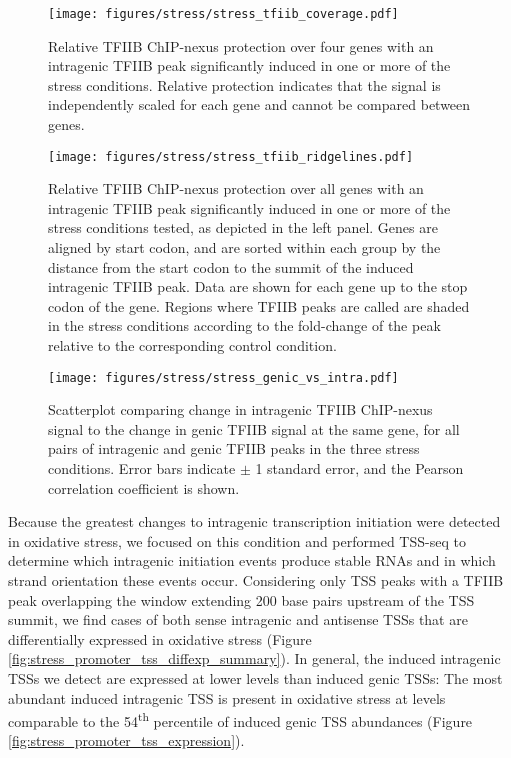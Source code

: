 \begin{figure}[h]
    \texttt{[image: figures/stress/stress\_tfiib\_coverage.pdf]}
    \caption[TFIIB ChIP-nexus protection over four genes with stress-induced intragenic TFIIB peaks.]{Relative TFIIB ChIP-nexus protection over four genes with an intragenic TFIIB peak significantly induced in one or more of the stress conditions. Relative protection indicates that the signal is independently scaled for each gene and cannot be compared between genes.}
    \label{fig:stress_tfiib_coverage}
\end{figure}

\clearpage

\begin{sidewaysfigure}
    \texttt{[image: figures/stress/stress\_tfiib\_ridgelines.pdf]}
    \caption[TFIIB ChIP-nexus protection over all genes with stress-induced intragenic TFIIB peaks.]{Relative TFIIB ChIP-nexus protection over all genes with an intragenic TFIIB peak significantly induced in one or more of the stress conditions tested, as depicted in the left panel. Genes are aligned by start codon, and are sorted within each group by the distance from the start codon to the summit of the induced intragenic TFIIB peak. Data are shown for each gene up to the stop codon of the gene. Regions where TFIIB peaks are called are shaded in the stress conditions according to the fold-change of the peak relative to the corresponding control condition.}
    \label{fig:stress_tfiib_ridgelines}
\end{sidewaysfigure}

\clearpage

\begin{SCfigure}[50][h]
    \texttt{[image: figures/stress/stress\_genic\_vs\_intra.pdf]}
    \caption[Scatterplot of change in intragenic versus genic TFIIB ChIP-nexus signal, for all pairs of intragenic and genic TFIIB peaks in the three stress conditions.]{Scatterplot comparing change in intragenic TFIIB ChIP-nexus signal to the change in genic TFIIB signal at the same gene, for all pairs of intragenic and genic TFIIB peaks in the three stress conditions. Error bars indicate $\pm$ 1 standard error, and the Pearson correlation coefficient is shown.}
    \label{fig:stress_genic_vs_intra}
\end{SCfigure}

Because the greatest changes to intragenic transcription initiation were detected in oxidative stress, we focused on this condition and performed TSS-seq to determine which intragenic initiation events produce stable RNAs and in which strand orientation these events occur.
Considering only TSS peaks with a TFIIB peak overlapping the window extending 200 base pairs upstream of the TSS summit, we find cases of both sense intragenic and antisense TSSs that are differentially expressed in oxidative stress (Figure \ref{fig:stress_promoter_tss_diffexp_summary}).
In general, the induced intragenic TSSs we detect are expressed at lower levels than induced genic TSSs: The most abundant induced intragenic TSS is present in oxidative stress at levels comparable to the 54\textsuperscript{th} percentile of induced genic TSS abundances (Figure \ref{fig:stress_promoter_tss_expression}).

